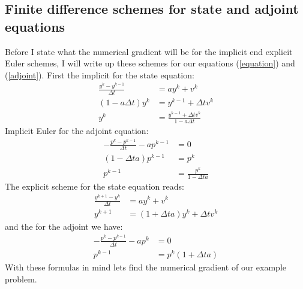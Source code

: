 \subsection{Finite difference schemes for state and adjoint equations}
Before I state what the numerical gradient will be for the implicit end explicit Euler schemes, I will write up these schemes for our equations (\ref{equation}) and (\ref{adjoint}). First the implicit for the state equation:
\begin{align}
\frac{y^k-y^{k-1}}{\Delta t} &= a y^{k} + v^{k} \\
(1-a\Delta t)y^{k} &= y^{k-1} +\Delta t v^{k} \\
y^k &=\frac{y^{k-1} +\Delta t v^{k}}{1-a\Delta t} \label{I_state}
\end{align}
Implicit Euler for the adjoint equation:
\begin{align}
-\frac{p^k-p^{k-1}}{\Delta t} -a p^{k-1} &=0 \\
(1-\Delta ta)p^{k-1}&=p^k \\
p^{k-1} &= \frac{p^k}{1-\Delta ta} \label{I_adjoint}
\end{align}
The explicit scheme for the state equation reads:
\begin{align}
\frac{y^{k+1}-y^{k}}{\Delta t} &= a y^{k} + v^{k} \\
y^{k+1}&=(1 +\Delta ta) y^{k} + \Delta t v^{k}\label{E_state}
\end{align} 
and the for the adjoint we have:
\begin{align}
-\frac{p^k-p^{k-1}}{\Delta t} -a p^{k} &=0 \\
p^{k-1} &=p^k(1 +\Delta ta)\label{E_adjoint}
\end{align}
With these formulas in mind lets find the numerical gradient of our example problem.
